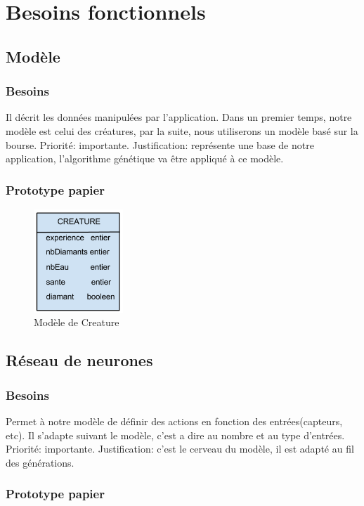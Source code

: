 \chapter{Besoins fonctionnels}

\section{Modèle}
\subsection{Besoins}
Il décrit les données manipulées par l'application. Dans un premier temps, notre modèle est celui des créatures, par la suite, nous utiliserons un modèle basé sur la bourse.
Priorité: importante.
Justification: représente une base de notre application, l'algorithme génétique va être appliqué à ce modèle.


\subsection{Prototype papier}

\begin{figure}[H]
    \centering
    \includegraphics[width=0.3\textwidth]{./pictures/creature.png}
    \caption{Modèle de Creature}
\end{figure}



\section{Réseau de neurones}
\subsection{Besoins}
Permet à notre modèle de définir des actions en fonction des entrées(capteurs, etc). Il s'adapte suivant le modèle, c'est a dire au nombre et au type d'entrées.
Priorité: importante.
Justification: c'est le cerveau du modèle, il est adapté au fil des générations.
\subsection{Prototype papier}

